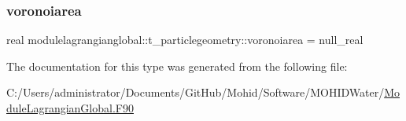 \mbox{\label{structmodulelagrangianglobal_1_1t__particlegeometry_a4864749591b6adb6c59f4e439653c4c7}} 
\subsubsection{\texorpdfstring{voronoiarea}{voronoiarea}}
{\footnotesize\ttfamily real modulelagrangianglobal\+::t\+\_\+particlegeometry\+::voronoiarea = null\+\_\+real\hspace{0.3cm}{\ttfamily [private]}}



The documentation for this type was generated from the following file\+:\begin{DoxyCompactItemize}
\item 
C\+:/\+Users/administrator/\+Documents/\+Git\+Hub/\+Mohid/\+Software/\+M\+O\+H\+I\+D\+Water/\mbox{\hyperlink{_module_lagrangian_global_8_f90}{Module\+Lagrangian\+Global.\+F90}}\end{DoxyCompactItemize}
